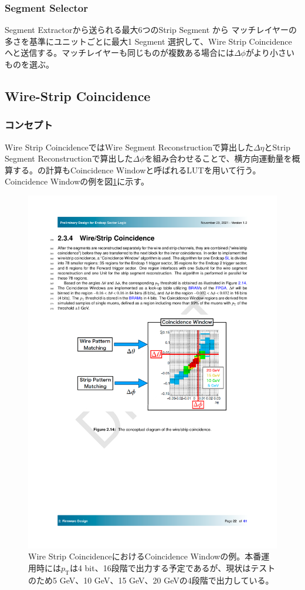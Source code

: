 \subsubsection*{Segment Selector}
Segment Extractorから送られる最大6つのStrip Segment から マッチレイヤーの多さを基準にユニットごとに最大1 Segment 選択して、Wire Strip Coincidence へと送信する。マッチレイヤーも同じものが複数ある場合には$\Delta\phi$がより小さいものを選ぶ。

\subsection{Wire-Strip Coincidence}
\subsubsection*{コンセプト}
Wire Strip CoincidenceではWire Segment Reconstructionで算出した$\Delta\eta$とStrip Segment Reconstructionで算出した$\Delta\phi$を組み合わせることで、横方向運動量\pt を概算する。\pt の計算もCoincidence Windowと呼ばれるLUTを用いて行う。Coincidence Windowの例を図\ref{Concept_WS}に示す。

\begin{figure} 
\centering
\includegraphics[width=16cm]{fig/SL/Concept_WS.pdf}
\caption[Wire Strip CoincidenceにおけるCoincidence Windowの例]{Wire Strip CoincidenceにおけるCoincidence Windowの例\cite{SLPDR}。本番運用時には$p_\mathrm{T}$は4 bit、16段階で出力する予定であるが、現状はテストのため5 GeV、10 GeV、15 GeV、20 GeVの4段階で出力している。}
\label{Concept_WS}
\end{figure}

